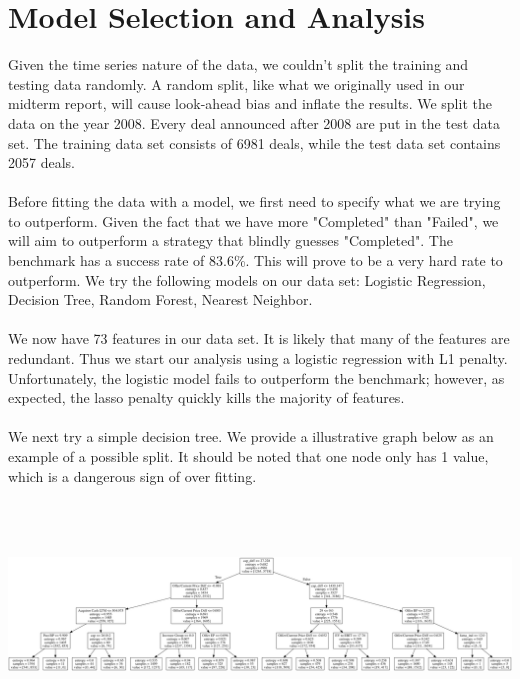 \documentclass[12pt]{article}
\begin{document}
\section{Model Selection and Analysis }
\label{sec:model}

Given the time series nature of the data, we couldn't split the training and testing data  randomly. A random split, like what we originally used in our midterm report, will cause look-ahead bias and inflate the results. We split the data on the year 2008. Every deal announced after 2008 are put in the test data set. The training data set consists of 6981 deals, while the test data set contains 2057 deals.
\\
\\
Before fitting the data with a model, we first need to specify what we are trying to outperform. Given the fact that we have more "Completed" than "Failed", we will aim to outperform a strategy that blindly guesses "Completed". The benchmark has a success rate of 83.6\%. This will prove to be a very hard rate to outperform. We try the following models on our data set: Logistic Regression, Decision Tree, Random Forest, Nearest Neighbor.
\\
\\
We now have 73 features in our data set. It is likely that many of the features are redundant. Thus we start our analysis using a logistic regression with L1 penalty. Unfortunately, the logistic model fails to outperform the benchmark; however, as expected, the lasso penalty quickly kills the majority of features. 
\\
\\
We next try a simple decision tree. We provide a illustrative graph below as an example of a possible split. It should be noted that one node only has 1 value, which is a dangerous sign of over fitting. 
\\
\\
\begin{center}
\includegraphics[width=14cm, height=5cm]{tree.png} 

\end{center}
\end{document}
